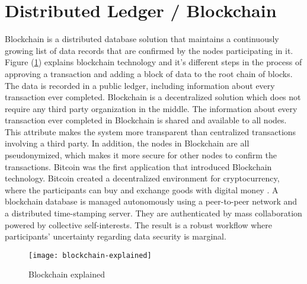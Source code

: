 \section{Distributed Ledger / Blockchain}
Blockchain is a distributed database solution that maintains a continuously growing list of data records that are confirmed by the nodes participating in it. Figure (\ref{fig:blockchain}) explains blockchain technology and it's different steps in the process of approving a transaction and adding a block of data to the root chain of blocks. The data is recorded in a public ledger, including information about every transaction ever completed. Blockchain is a decentralized solution which does not require any third party organization in the middle. The information about every transaction ever completed in Blockchain is shared and available to all nodes.
This attribute makes the system more transparent than centralized transactions involving a third party. In addition, the nodes in Blockchain are all pseudonymized, which makes it more secure for other nodes to confirm the transactions. Bitcoin was the first application that introduced Blockchain technology. Bitcoin created a decentralized environment for cryptocurrency, where the participants can buy and exchange goods with digital money \cite{ref-40}. A blockchain database is managed autonomously using a peer-to-peer network and a distributed time-stamping server. They are authenticated by mass collaboration powered by collective self-interests. The result is a robust workflow where participants' uncertainty regarding data security is marginal.

\vfill
\pagebreak

\begin{figure}[H]
	\centering
	\texttt{[image: blockchain-explained]}
	\caption{Blockchain explained}
	\label{fig:blockchain}
\end{figure}

